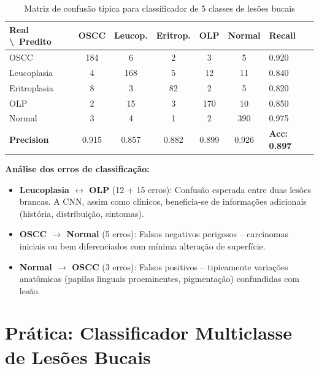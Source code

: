 \begin{table}[H]
  \centering
  \caption{Matriz de confusão típica para classificador de 5 classes de lesões bucais}
  \label{tab:confusao-5}
  \begin{tabularx}{\textwidth}{lcccccX}
    \toprule
    \textbf{Real \textbackslash\ Predito} & \textbf{OSCC} & \textbf{Leucop.} & \textbf{Eritrop.} & \textbf{OLP} & \textbf{Normal} & \textbf{Recall} \\
    \midrule
    OSCC & 184 & 6 & 2 & 3 & 5 & 0.920 \\
    Leucoplasia & 4 & 168 & 5 & 12 & 11 & 0.840 \\
    Eritroplasia & 8 & 3 & 82 & 2 & 5 & 0.820 \\
    OLP & 2 & 15 & 3 & 170 & 10 & 0.850 \\
    Normal & 3 & 4 & 1 & 2 & 390 & 0.975 \\
    \midrule
    \textbf{Precision} & 0.915 & 0.857 & 0.882 & 0.899 & 0.926 & \textbf{Acc: 0.897} \\
    \bottomrule
  \end{tabularx}
\end{table}

\textbf{Análise dos erros de classificação:}
\begin{itemize}
  \item \textbf{Leucoplasia $\leftrightarrow$ OLP} (12 + 15 erros): Confusão
        esperada entre duas lesões brancas. A CNN, assim como clínicos, beneficia-se
        de informações adicionais (história, distribuição, sintomas).
  \item \textbf{OSCC $\rightarrow$ Normal} (5 erros): Falsos negativos perigosos
        -- carcinomas iniciais ou bem diferenciados com mínima alteração de superfície.
  \item \textbf{Normal $\rightarrow$ OSCC} (3 erros): Falsos positivos -- tipicamente
        variações anatômicas (papilas linguais proeminentes, pigmentação) confundidas
        com lesão.
\end{itemize}

\section{Prática: Classificador Multiclasse de Lesões Bucais}
\label{sec:pratica-lesoes}

\niveltres

